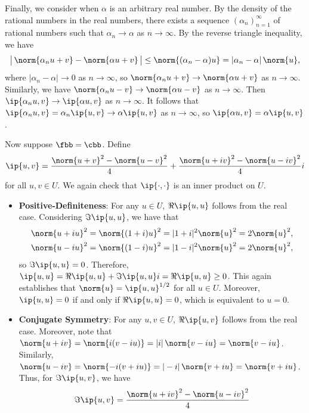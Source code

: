 \begin{sol}
\begin{itemize}
        Finally, we consider when $\alpha$ is an arbitrary real number.
        By the density of the rational numbers in the real numbers, there exists a sequence $(\alpha_n)_{n=1}^{\infty}$ of rational numbers such that $\alpha_n \to \alpha$ as $n \to \infty$.
        By the reverse triangle inequality, we have
        \[
            \bigl|\,\norm{\alpha_n u + v} - \norm{\alpha u + v}\,\bigr| \leq \norm{(\alpha_n - \alpha)u} = |\alpha_n - \alpha|\,\norm{u},
        \]
        where $|\alpha_n - \alpha| \to 0$ as $n \to \infty$, so $\norm{\alpha_n u + v} \to \norm{\alpha u + v}$ as $n \to \infty$.
        Similarly, we have $\norm{\alpha_n u - v} \to \norm{\alpha u - v}$ as $n \to \infty$.
        Then $\ip{\alpha_n u, v} \to \ip{\alpha u, v}$ as $n \to \infty$.
        It follows that $\ip{\alpha_n u, v} = \alpha_n\ip{u, v} \to \alpha\ip{u, v}$ as $n \to \infty$, so $\ip{\alpha u, v} = \alpha\ip{u, v}$.
    \end{itemize}
    Now suppose $\fbb = \cbb$.
    Define
    \[
        \ip{u, v} = \frac{\norm{u + v}^2 - \norm{u - v}^2}{4} + \frac{\norm{u + iv}^2 - \norm{u - iv}^2}{4}i
    \]
    for all $u, v \in U$.
    We again check that $\ip{\cdot, \cdot}$ is an inner product on $U$.
    \begin{itemize}
        \item \textbf{Positive-Definiteness}: For any $u \in U$, $\Re\ip{u, u}$ follows from the real case.
        Considering $\Im\ip{u, u}$, we have that
        \begin{align*}
            \norm{u + iu}^2 &= \norm{(1 + i)u}^2 = |1 + i|^2 \norm{u}^2 = 2\norm{u}^2, \\
            \norm{u - iu}^2 &= \norm{(1 - i)u}^2 = |1 - i|^2 \norm{u}^2 = 2\norm{u}^2,
        \end{align*}
        so $\Im\ip{u, u} = 0$.
        Therefore, $\ip{u, u} = \Re\ip{u, u} + \Im\ip{u, u}i = \Re\ip{u, u} \geq 0$.
        This again establishes that $\norm{u} = \ip{u, u}^{1/2}$ for all $u \in U$.
        Moreover, $\ip{u, u} = 0$ if and only if $\Re\ip{u, u} = 0$, which is equivalent to $u = 0$.
        \item \textbf{Conjugate Symmetry}: For any $u, v \in U$, $\Re\ip{u, v}$ follows from the real case.
        Moreover, note that $\norm{u + iv} = \norm{i(v - iu)} = |i|\,\norm{v - iu} = \norm{v - iu}$.
        Similarly, $\norm{u - iv} = \norm{-i(v + iu)} = |-i|\,\norm{v + iu} = \norm{v + iu}$.
        Thus, for $\Im\ip{u, v}$, we have
        \begin{align*}
            \Im\ip{u, v} &= \frac{\norm{u + iv}^2 - \norm{u - iv}^2}{4} \\

\end{align*}
\end{itemize}
\end{sol}
